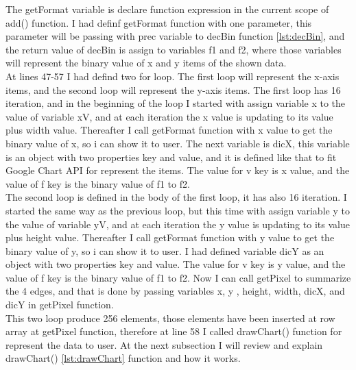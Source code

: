 \documentclass[11pt]{article}
\begin{document}
The getFormat variable is declare function expression in the current scope of add() function. I had definf getFormat function with one parameter, this parameter will be passing with prec variable to decBin function \ref{lst:decBin}, and the return value of decBin is assign to variables f1 and f2, where those variables will represent the binary value of x and y items of the shown data.\\

At lines 47-57 I had defind two for loop. The first loop will represent the x-axis items, and the second loop will represent the y-axis items.
The first loop has 16 iteration, and in the beginning of the loop I started with assign variable x to the value of variable xV, and at each iteration the x value is updating to its value plus width value. Thereafter I call getFormat function with x value to get the binary value of x, so i can show it to user. The next variable is dicX, this variable is an object with two properties key and value, and it is defined like that to fit Google Chart API for represent the items. The value for v key is x value, and the value of f key is the binary value of f1 to f2.\\
The second loop is defined in the body of the first loop, it has also 16 iteration. I started the same way as the previous loop, but this time with assign variable y to the value of variable yV, and at each iteration the y value is updating to its value plus height value. Thereafter I call getFormat function with y value to get the binary value of y, so i can show it to user. I had defined variable dicY as an object with two properties key and value. The value for v key is y value, and the value of f key is the binary value of f1 to f2. Now I can call getPixel to summarize the 4 edges, and that is done by passing variables x, y , height, width, dicX, and dicY in getPixel function.\\
This two loop produce 256 elements, those elements have been inserted at row array at getPixel function, therefore at line 58 I called drawChart() function for represent the data to user. At the next subsection I will review and explain drawChart() \ref{lst:drawChart} function and how it works.\\
\end{document}

